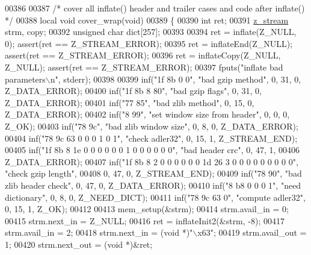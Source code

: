\begin{DoxyCode}
{{{{{00386 
00387 \textcolor{comment}{/* cover all inflate() header and trailer cases and code after inflate() */}
00388 local \textcolor{keywordtype}{void} cover\_wrap(\textcolor{keywordtype}{void})
00389 \{
00390     \textcolor{keywordtype}{int} ret;
00391     \hyperlink{structz__stream__s}{z\_stream} strm, copy;
00392     \textcolor{keywordtype}{unsigned} \textcolor{keywordtype}{char} dict[257];
00393 
00394     ret = inflate(Z\_NULL, 0);                   assert(ret == Z\_STREAM\_ERROR);
00395     ret = inflateEnd(Z\_NULL);                   assert(ret == Z\_STREAM\_ERROR);
00396     ret = inflateCopy(Z\_NULL, Z\_NULL);          assert(ret == Z\_STREAM\_ERROR);
00397     fputs(\textcolor{stringliteral}{"inflate bad parameters\(\backslash\)n"}, stderr);
00398 
00399     inf(\textcolor{stringliteral}{"1f 8b 0 0"}, \textcolor{stringliteral}{"bad gzip method"}, 0, 31, 0, Z\_DATA\_ERROR);
00400     inf(\textcolor{stringliteral}{"1f 8b 8 80"}, \textcolor{stringliteral}{"bad gzip flags"}, 0, 31, 0, Z\_DATA\_ERROR);
00401     inf(\textcolor{stringliteral}{"77 85"}, \textcolor{stringliteral}{"bad zlib method"}, 0, 15, 0, Z\_DATA\_ERROR);
00402     inf(\textcolor{stringliteral}{"8 99"}, \textcolor{stringliteral}{"set window size from header"}, 0, 0, 0, Z\_OK);
00403     inf(\textcolor{stringliteral}{"78 9c"}, \textcolor{stringliteral}{"bad zlib window size"}, 0, 8, 0, Z\_DATA\_ERROR);
00404     inf(\textcolor{stringliteral}{"78 9c 63 0 0 0 1 0 1"}, \textcolor{stringliteral}{"check adler32"}, 0, 15, 1, Z\_STREAM\_END);
00405     inf(\textcolor{stringliteral}{"1f 8b 8 1e 0 0 0 0 0 0 1 0 0 0 0 0 0"}, \textcolor{stringliteral}{"bad header crc"}, 0, 47, 1,
00406         Z\_DATA\_ERROR);
00407     inf(\textcolor{stringliteral}{"1f 8b 8 2 0 0 0 0 0 0 1d 26 3 0 0 0 0 0 0 0 0 0"}, \textcolor{stringliteral}{"check gzip length"},
00408         0, 47, 0, Z\_STREAM\_END);
00409     inf(\textcolor{stringliteral}{"78 90"}, \textcolor{stringliteral}{"bad zlib header check"}, 0, 47, 0, Z\_DATA\_ERROR);
00410     inf(\textcolor{stringliteral}{"8 b8 0 0 0 1"}, \textcolor{stringliteral}{"need dictionary"}, 0, 8, 0, Z\_NEED\_DICT);
00411     inf(\textcolor{stringliteral}{"78 9c 63 0"}, \textcolor{stringliteral}{"compute adler32"}, 0, 15, 1, Z\_OK);
00412 
00413     mem\_setup(&strm);
00414     strm.avail\_in = 0;
00415     strm.next\_in = Z\_NULL;
00416     ret = inflateInit2(&strm, -8);
00417     strm.avail\_in = 2;
00418     strm.next\_in = (\textcolor{keywordtype}{void} *)\textcolor{stringliteral}{"\(\backslash\)x63"};
00419     strm.avail\_out = 1;
00420     strm.next\_out = (\textcolor{keywordtype}{void} *)&ret;
}}}}}
\end{DoxyCode}

